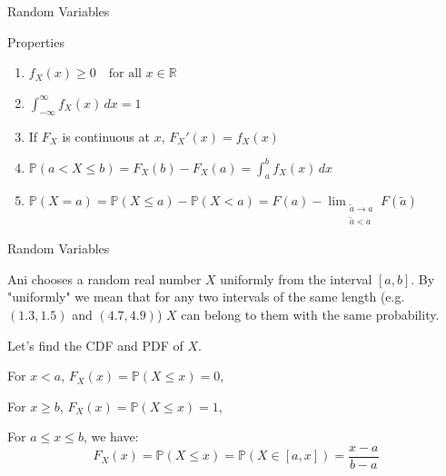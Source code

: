 \documentclass{beamer}
\newcommand{\PP}{\mathbb{P}}
\begin{document}
\begin{frame}{Random Variables}
\begin{block}{Properties}
    \begin{enumerate}[<+->]
        \item $f_X(x) \geq 0 \quad \text{for all } x \in \mathbb{R}$
        \item $\displaystyle\int_{-\infty}^{\infty} f_X(x) \, dx = 1$
        \item If $F_X$ is continuous at $x$, $F_X'(x)=f_X(x)$
        \item $\displaystyle\PP(a < X \leq b) = F_X(b) - F_X(a) = \int_{a}^{b} f_X(x) \, dx$
        \item $\displaystyle\PP(X=a) =\PP(X\le a)-\PP(X<a)=F(a)-\lim_{\substack{\tilde{a}\to a\\\tilde{a} < a}} F(\tilde{a})$
    \end{enumerate}
\end{block}
\end{frame}



\begin{frame}{Random Variables}
\begin{example}
    Ani chooses a random real number $X$ uniformly from the interval $[a,b]$.
\newline
\newline 
    {\small By "uniformly" we mean that for any two intervals of the same length (e.g. $(1.3, 1.5)$ and $(4.7, 4.9)$) $X$ can belong to them with the same probability.}
\newline 

    \pause Let's find the CDF and PDF of $X$.\pause

\end{example}

\pause
For $x<a$, $F_X(x)=\PP(X\le x)=0$,\pause

\medskip

For $x \ge b$, $F_X(x)=\PP(X \le x)=1$,\pause

\medskip

For $a\le x \le b$, we have:
\[F_X(x)=\PP(X\le x)=\PP(X\in[a,x])=\dfrac{x-a}{b-a}
\]
\end{frame}
\end{document}
